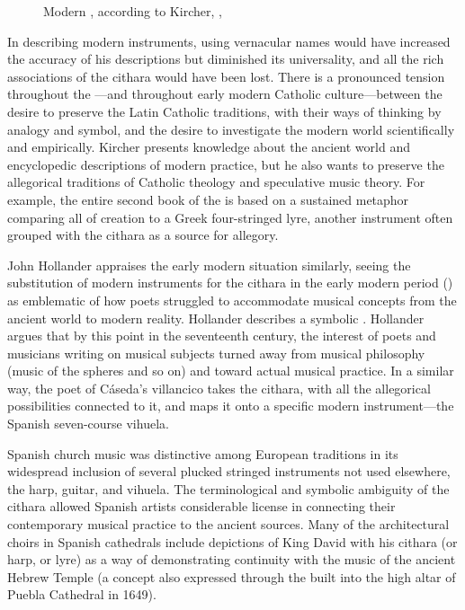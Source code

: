 \begin{figure}
    \caption{Modern , according to Kircher, , }
    \label{fig:Kircher-citharae}
\end{figure}

In describing modern instruments, using vernacular names would have increased
the accuracy of his descriptions but diminished its universality, and all the
rich associations of the cithara would have been lost.
There is a pronounced tension throughout the ---and throughout
early modern Catholic culture---between the desire to preserve the Latin
Catholic traditions, with their ways of thinking by analogy and symbol, and the
desire to investigate the modern world scientifically and empirically.
Kircher presents  knowledge about the ancient world and
encyclopedic descriptions of modern practice, but he also wants to preserve the
allegorical traditions of Catholic theology and speculative music theory.
For example, the entire second book of the  is based on a
sustained metaphor comparing all of creation to a Greek four-stringed lyre,
another instrument often grouped with the cithara as a source for allegory.

John Hollander appraises the early modern situation similarly, seeing the
substitution of modern instruments for the cithara in the early modern period
() as emblematic of how poets struggled to accommodate
musical concepts from the ancient world to modern reality.
Hollander describes a symbolic .%
    \Autocite[44--51]{Hollander:Untuning}
Hollander argues that by this point in the seventeenth century, the interest of
poets and musicians writing on musical subjects turned away from musical
philosophy (music of the spheres and so on) and toward actual musical practice. 
In a similar way, the poet of Cáseda's villancico takes the cithara, with all
the allegorical possibilities connected to it, and maps it onto a specific
modern instrument---the Spanish seven-course vihuela.


Spanish church music was distinctive among European traditions in its
widespread inclusion of several plucked stringed instruments not used
elsewhere, the harp, guitar, and vihuela. 
The terminological and symbolic ambiguity of the cithara allowed Spanish
artists considerable license in connecting their contemporary musical practice
to the ancient sources.
Many of the architectural choirs in Spanish cathedrals include depictions of
King David with his cithara (or harp, or lyre) as a way of demonstrating
continuity with the music of the ancient Hebrew Temple (a concept also
expressed through the  built into the high altar of
Puebla Cathedral in 1649).

